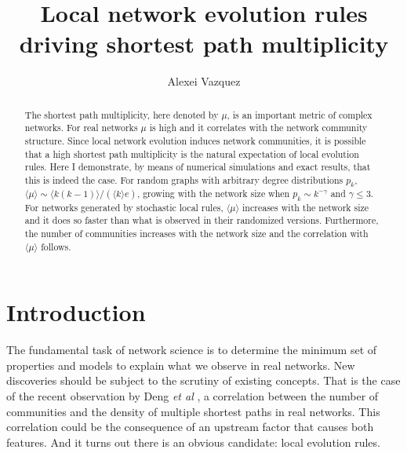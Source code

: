 \documentclass[reprint,aps,pre,amsmath,amssymb,superscriptaddress,showpacs]{revtex4-1}
\begin{document}
\title{Local network evolution rules driving shortest path multiplicity}

\author{Alexei Vazquez}

\begin{abstract}
The shortest path multiplicity, here denoted by $\mu$, is an important metric of complex networks. For real networks $\mu$ is high and it correlates with the network community structure. Since local network evolution induces network communities, it is possible that a high shortest path multiplicity is the natural expectation of local evolution rules. Here I demonstrate, by means of numerical simulations and exact results, that this is indeed the case. For random graphs with arbitrary degree distributions $p_k$, $\langle\mu\rangle\sim \langle k(k-1)\rangle / (\langle k\rangle e)$, growing with the network size when $p_k\sim k^{-\gamma}$ and $\gamma\leq3$. For networks generated by stochastic local rules, $\langle\mu\rangle$ increases with the network size and it does so faster than what is observed in their randomized versions. Furthermore, the number of communities increases with the network size and the correlation with $\langle \mu\rangle$ follows.
\end{abstract}

\maketitle

\section{Introduction}

The fundamental task of network science is to determine the minimum set of properties and models to explain what we observe in real networks. New discoveries should be subject to the scrutiny of existing concepts. That is the case of the recent observation by Deng {\em et al} \cite{deng2026multipath}, a correlation between the number of communities and the density of multiple shortest paths in real networks. This correlation could be the consequence of an upstream factor that causes both features. And it turns out there is an obvious candidate: local evolution rules.
\end{document}
